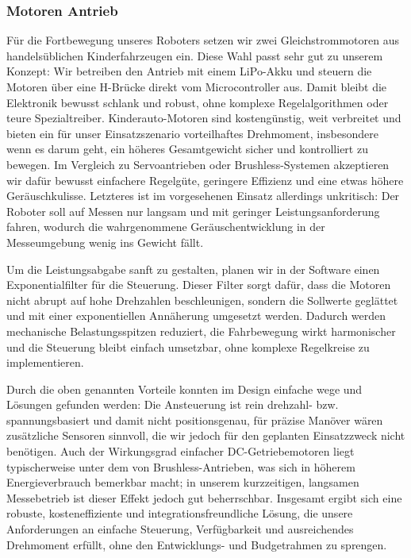 \subsubsection{Motoren Antrieb}
Für die Fortbewegung unseres Roboters setzen wir zwei Gleichstrommotoren aus handelsüblichen Kinderfahrzeugen ein. Diese Wahl passt sehr gut zu unserem Konzept: Wir betreiben den Antrieb mit einem LiPo-Akku und steuern die Motoren über eine H-Brücke direkt vom Microcontroller aus. Damit bleibt die Elektronik bewusst schlank und robust, ohne komplexe Regelalgorithmen oder teure Spezialtreiber. Kinderauto-Motoren sind kostengünstig, weit verbreitet und bieten ein für unser Einsatzszenario vorteilhaftes Drehmoment, insbesondere wenn es darum geht, ein höheres Gesamtgewicht sicher und kontrolliert zu bewegen. Im Vergleich zu Servoantrieben oder Brushless-Systemen akzeptieren wir dafür bewusst einfachere Regelgüte, geringere Effizienz und eine etwas höhere Geräuschkulisse. Letzteres ist im vorgesehenen Einsatz allerdings unkritisch: Der Roboter soll auf Messen nur langsam und mit geringer Leistungsanforderung fahren, wodurch die wahrgenommene Geräuschentwicklung in der Messeumgebung wenig ins Gewicht fällt. 

Um die Leistungsabgabe sanft zu gestalten, planen wir in der Software einen Exponentialfilter für die Steuerung. Dieser Filter sorgt dafür, dass die Motoren nicht abrupt auf hohe Drehzahlen beschleunigen, sondern die Sollwerte geglättet und mit einer exponentiellen Annäherung umgesetzt werden. Dadurch werden mechanische Belastungsspitzen reduziert, die Fahrbewegung wirkt harmonischer und die Steuerung bleibt einfach umsetzbar, ohne komplexe Regelkreise zu implementieren.

Durch die oben genannten Vorteile konnten im Design einfache wege und Lösungen gefunden werden: Die Ansteuerung ist rein drehzahl- bzw. spannungsbasiert und damit nicht positionsgenau, für präzise Manöver wären zusätzliche Sensoren sinnvoll, die wir jedoch für den geplanten Einsatzzweck nicht benötigen. Auch der Wirkungsgrad einfacher DC-Getriebemotoren liegt typischerweise unter dem von Brushless-Antrieben, was sich in höherem Energieverbrauch bemerkbar macht; in unserem kurzzeitigen, langsamen Messebetrieb ist dieser Effekt jedoch gut beherrschbar. Insgesamt ergibt sich eine robuste, kosteneffiziente und integrationsfreundliche Lösung, die unsere Anforderungen an einfache Steuerung, Verfügbarkeit und ausreichendes Drehmoment erfüllt, ohne den Entwicklungs- und Budgetrahmen zu sprengen.

